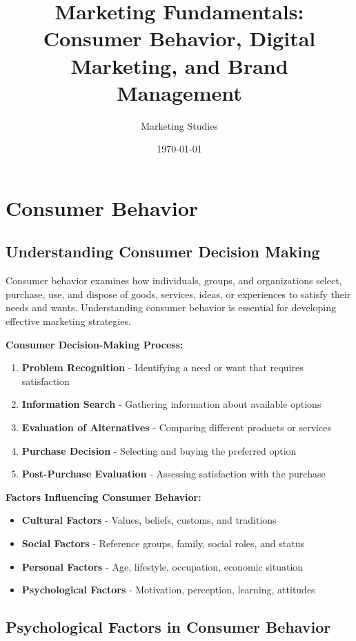 \documentclass[12pt]{article}
\title{Marketing Fundamentals: Consumer Behavior, Digital Marketing, and Brand Management}
\author{Marketing Studies}
\date{\today}
\begin{document}
\maketitle

\section{Consumer Behavior}

\subsection{Understanding Consumer Decision Making}
Consumer behavior examines how individuals, groups, and organizations select, purchase, use, and dispose of goods, services, ideas, or experiences to satisfy their needs and wants. Understanding consumer behavior is essential for developing effective marketing strategies.

\textbf{Consumer Decision-Making Process:}
\begin{enumerate}
    \item \textbf{Problem Recognition} - Identifying a need or want that requires satisfaction
    \item \textbf{Information Search} - Gathering information about available options
    \item \textbf{Evaluation of Alternatives} - Comparing different products or services
    \item \textbf{Purchase Decision} - Selecting and buying the preferred option
    \item \textbf{Post-Purchase Evaluation} - Assessing satisfaction with the purchase
\end{enumerate}

\textbf{Factors Influencing Consumer Behavior:}
\begin{itemize}
    \item \textbf{Cultural Factors} - Values, beliefs, customs, and traditions
    \item \textbf{Social Factors} - Reference groups, family, social roles, and status
    \item \textbf{Personal Factors} - Age, lifestyle, occupation, economic situation
    \item \textbf{Psychological Factors} - Motivation, perception, learning, attitudes
\end{itemize}

\subsection{Psychological Factors in Consumer Behavior}
\end{document}
